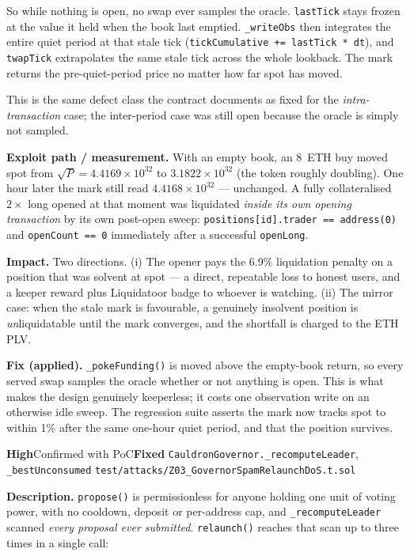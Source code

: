 \documentclass[10pt,a4paper]{article}
\newcommand{\sev}[2]{\textcolor{#1}{\textbf{#2}}}
\newcommand{\SevHigh}{\sev{high}{High}}
\newcommand{\Fixed}{\textcolor{ok}{\textbf{Fixed}}}
\newcommand{\code}[1]{\texttt{\small #1}}
\begin{document}
So while nothing is open, no swap ever samples the oracle. \code{lastTick} stays frozen at
the value it held when the book last emptied. \code{\_writeObs} then integrates the entire
quiet period at that stale tick (\code{tickCumulative += lastTick * dt}), and
\code{twapTick} extrapolates the same stale tick across the whole lookback. The mark
returns the pre-quiet-period price no matter how far spot has moved.

This is the same defect class the contract documents as fixed for the
\emph{intra-transaction} case; the inter-period case was still open because the oracle is
simply not sampled.

\textbf{Exploit path / measurement.} With an empty book, an 8~ETH buy moved spot from
$\sqrt{P}=4.4169\times10^{32}$ to $3.1822\times10^{32}$ (the token roughly doubling). One
hour later the mark still read $4.4168\times10^{32}$ --- unchanged. A fully collateralised
$2\times$ long opened at that moment was liquidated \emph{inside its own opening
transaction} by its own post-open sweep: \code{positions[id].trader == address(0)} and
\code{openCount == 0} immediately after a successful \code{openLong}.

\textbf{Impact.} Two directions. (i) The opener pays the 6.9\% liquidation penalty on a
position that was solvent at spot --- a direct, repeatable loss to honest users, and a
keeper reward plus Liquidatoor badge to whoever is watching. (ii) The mirror case: when
the stale mark is favourable, a genuinely insolvent position is \emph{un}liquidatable
until the mark converges, and the shortfall is charged to the ETH PLV.

\textbf{Fix (applied).} \code{\_pokeFunding()} is moved above the empty-book return, so
every served swap samples the oracle whether or not anything is open. This is what makes
the design genuinely keeperless; it costs one observation write on an otherwise idle
sweep. The regression suite asserts the mark now tracks spot to within 1\% after the same
one-hour quiet period, and that the position survives.

{\SevHigh}{Confirmed with PoC}{\Fixed}
{\code{CauldronGovernor.\_recomputeLeader}, \code{\_bestUnconsumed}}
{\code{test/attacks/Z03\_GovernorSpamRelaunchDoS.t.sol}}

\textbf{Description.} \code{propose()} is permissionless for anyone holding one unit of
voting power, with no cooldown, deposit or per-address cap, and
\code{\_recomputeLeader} scanned \emph{every proposal ever submitted}.
\code{relaunch()} reaches that scan up to three times in a single call:
\end{document}
